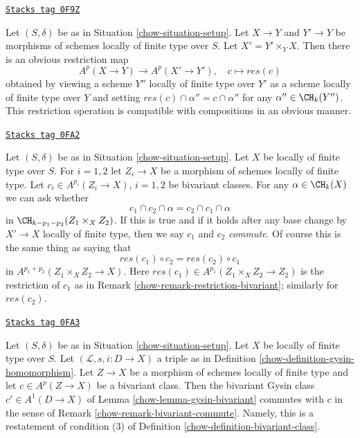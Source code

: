 \begin{remark}
\label{chow-remark-restriction-bivariant}
\href{https://stacks.math.columbia.edu/tag/0F9Z}{\texttt{Stacks tag 0F9Z}}

Let $(S, \delta)$ be as in Situation \ref{chow-situation-setup}. Let $X \to Y$
and $Y' \to Y$ be morphisms of schemes locally of finite type over $S$.
Let $X' = Y' \times_Y X$. Then there is an obvious restriction map
$$
A^p(X \to Y) \longrightarrow A^p(X' \to Y'),\quad
c \longmapsto res(c)
$$
obtained by viewing a scheme $Y''$ locally of finite type over $Y'$
as a scheme locally of finite type over $Y$ and setting
$res(c) \cap \alpha'' = c \cap \alpha''$ for any $\alpha'' \in \CH_k(Y'')$.
This restriction operation is compatible with compositions in an
obvious manner.
\end{remark}

\begin{remark}
\label{chow-remark-bivariant-commute}
\href{https://stacks.math.columbia.edu/tag/0FA2}{\texttt{Stacks tag 0FA2}}

Let $(S, \delta)$ be as in Situation \ref{chow-situation-setup}. Let $X$ be
locally of finite type over $S$. For $i = 1, 2$ let $Z_i \to X$
be a morphism of schemes locally of finite type. Let
$c_i \in A^{p_i}(Z_i \to X)$, $i = 1, 2$ be bivariant classes.
For any $\alpha \in \CH_k(X)$ we can ask whether
$$
c_1 \cap c_2 \cap \alpha = c_2 \cap c_1 \cap \alpha
$$
in $\CH_{k - p_1 - p_2}(Z_1 \times_X Z_2)$. If this is true and if it holds
after any base change by $X' \to X$ locally of finite type, then we say
$c_1$ and $c_2$ {\it commute}. Of course this is the same thing as saying that
$$
res(c_1) \circ c_2 = res(c_2) \circ c_1
$$
in $A^{p_1 + p_2}(Z_1 \times_X Z_2 \to X)$. Here
$res(c_1) \in A^{p_1}(Z_1 \times_X Z_2 \to Z_2)$ is the restriction of $c_1$
as in Remark \ref{chow-remark-restriction-bivariant}; similarly for $res(c_2)$.
\end{remark}

\begin{example}
\label{chow-example-gysin-commute}
\href{https://stacks.math.columbia.edu/tag/0FA3}{\texttt{Stacks tag 0FA3}}

Let $(S, \delta)$ be as in Situation \ref{chow-situation-setup}. Let $X$ be locally
of finite type over $S$. Let $(\mathcal{L}, s, i : D \to X)$ a triple as in
Definition \ref{chow-definition-gysin-homomorphism}. Let $Z \to X$ be a morphism
of schemes locally of finite type and let $c \in A^p(Z \to X)$ be a
bivariant class. Then the bivariant Gysin class $c' \in A^1(D \to X)$ of
Lemma \ref{chow-lemma-gysin-bivariant} commutes with $c$ in the sense of
Remark \ref{chow-remark-bivariant-commute}. Namely, this is a restatement of
condition (3) of Definition \ref{chow-definition-bivariant-class}.
\end{example}

